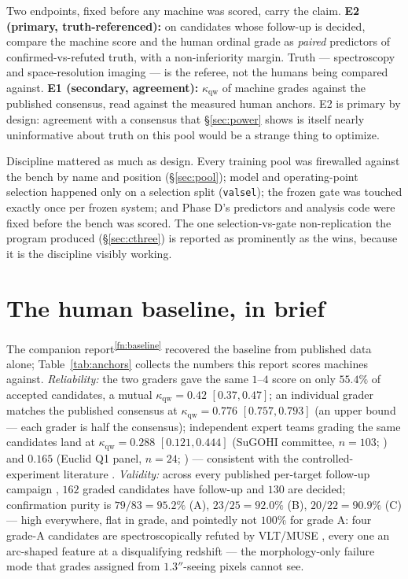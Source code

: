 \documentclass[11pt,letterpaper]{article}
\newcommand{\qwk}{\ensuremath{\kappa_{\mathrm{qw}}}}
\begin{document}
Two endpoints, fixed before any machine was scored, carry the claim. \textbf{E2
(primary, truth-referenced):} on candidates whose follow-up is decided, compare the
machine score and the human ordinal grade as \emph{paired} predictors of
confirmed-vs-refuted truth, with a non-inferiority margin. Truth --- spectroscopy and
space-resolution imaging --- is the referee, not the humans being compared against.
\textbf{E1 (secondary, agreement):} \qwk{} of machine grades against the published
consensus, read against the measured human anchors. E2 is primary by design: agreement
with a consensus that \S\ref{sec:power} shows is itself nearly uninformative about
truth on this pool would be a strange thing to optimize.

Discipline mattered as much as design. Every training pool was firewalled against the
bench by name and position (\S\ref{sec:pool}); model and operating-point selection
happened only on a selection split (\texttt{valsel}); the frozen gate was touched
exactly once per frozen system; and Phase D's predictors and analysis code were fixed
before the bench was scored. The one selection-vs-gate non-replication the program
produced (\S\ref{sec:cthree}) is reported as prominently as the wins, because it is the
discipline visibly working.

\section{The human baseline, in brief}\label{sec:baseline}
The companion report\textsuperscript{\ref{fn:baseline}} recovered the baseline from
published data alone; Table~\ref{tab:anchors} collects the numbers this report scores
machines against. \emph{Reliability:} the two \citet{huang2021desi} graders gave the
same $1$--$4$ score on only $55.4\%$ of accepted candidates, a mutual $\qwk=0.42$
$[0.37,0.47]$; an individual grader matches the published consensus at $\qwk=0.776$
$[0.757,0.793]$ (an upper bound --- each grader is half the consensus); independent
expert teams grading the same candidates land at $\qwk=0.288$ $[0.121,0.444]$ (SuGOHI
committee, $n=103$; \citealt{sonnenfeld2018sugohi}) and $0.165$ (Euclid Q1 panel,
$n=24$; \citealt{euclidq1engine}) --- consistent with the controlled-experiment
literature \citep{rojas2023vi,canameras2021holismokes}. \emph{Validity:} across every
published per-target follow-up campaign \citep{huang2025foundry1,huang2025foundry2,
agarwal2025foundry3,lin2025foundry4,tran2022agel,barone2025agel,shu2025hscdesi,
sonnenfeld2018sugohi}, $162$ graded candidates have follow-up and $130$ are decided;
confirmation purity is $79/83=95.2\%$ (A), $23/25=92.0\%$ (B), $20/22=90.9\%$ (C) ---
high everywhere, flat in grade, and pointedly not $100\%$ for grade A: four grade-A
candidates are spectroscopically refuted by VLT/MUSE \citep{lin2025foundry4}, every one
an arc-shaped feature at a disqualifying redshift --- the morphology-only failure mode
that grades assigned from $1.3''$-seeing pixels cannot see.
\end{document}

